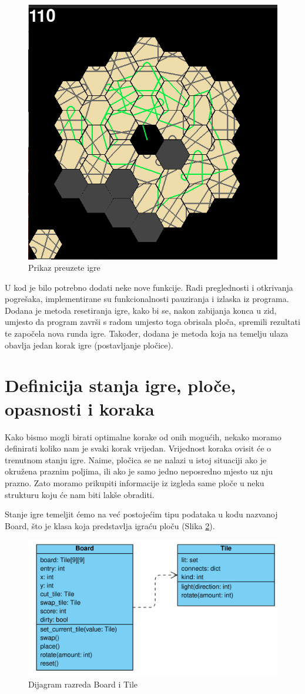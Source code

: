 \documentclass[zavrsnirad]{fer}
\begin{document}
\begin{figure}[htb]
	\centering
	\includegraphics[width=0.58\linewidth]{Figures/gamefinished.png} 
	\caption{Prikaz preuzete igre}
	\label{slk:game_finished}
\end{figure}

U kod je bilo potrebno dodati neke nove funkcije. Radi preglednosti i otkrivanja pogrešaka, implementirane su funkcionalnosti pauziranja i izlaska iz programa. Dodana je metoda resetiranja igre, kako bi se, nakon zabijanja konca u zid, umjesto da program završi s radom umjesto toga obrisala ploča, spremili rezultati te započela nova runda igre. Također, dodana je metoda koja na temelju ulaza obavlja jedan korak igre (postavljanje pločice).



\section{Definicija stanja igre, ploče, opasnosti i koraka}
\label{pog:definicija_stanja}

Kako bismo mogli birati optimalne korake od onih mogućih, nekako moramo definirati koliko nam je svaki korak vrijedan. Vrijednost koraka ovisit će o trenutnom stanju igre. Naime, pločica se ne nalazi u istoj situaciji ako je okružena praznim poljima, ili ako je samo jedno neposredno mjesto uz nju prazno. Zato moramo prikupiti informacije iz izgleda same ploče u neku strukturu koju će nam biti lakše obraditi.

Stanje igre temeljit ćemo na već postojećim tipu podataka u kodu nazvanoj Board, što je klasa koja predstavlja igraću ploču (Slika \ref{slk:class_diagram}).

\begin{figure}[htb]
	\centering
	\includegraphics[width=0.68\linewidth]{Figures/board_diagram.png} 
	\caption{Dijagram razreda Board i Tile}
	\label{slk:class_diagram}
\end{figure}
\end{document}
